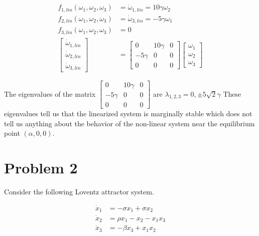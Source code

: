 \documentclass{article}
\begin{document}
  \begin{align*}
    f_{1, lin}(\omega_1,\omega_2, \omega_3) &= \dot{\omega}_{1,lin} = 10\gamma\omega_2 \\
    f_{2, lin}(\omega_1,\omega_2, \omega_3) &= \dot{\omega}_{3,lin} = -5\gamma\omega_1 \\
    f_{3, lin}(\omega_1,\omega_2, \omega_3) &= 0 \\
    \begin{bmatrix}
      \dot{\omega}_{1,lin} \\
      \dot{\omega}_{2,lin} \\
      \dot{\omega}_{3,lin}
    \end{bmatrix} &=
    \begin{bmatrix}
      0 & 10\gamma & 0 \\
      -5\gamma & 0 & 0 \\
      0 & 0 & 0
    \end{bmatrix}
    \begin{bmatrix}
      \omega_1 \\
      \omega_2 \\
      \omega_3
    \end{bmatrix}
  \end{align*}
    
  \noindent The eigenvalues of the matrix 
  $\begin{bmatrix}
      0 & 10\gamma & 0 \\
      -5\gamma & 0 & 0 \\
      0 & 0 & 0
  \end{bmatrix}$
  are $\lambda_{1,2,3} = 0, \pm 5\sqrt{2}\gamma$ \vspace{3.0mm}
  These eigenvalues tell us that the linearized system is marginally stable
  which does not tell us anything about the behavior of the non-linear system
  near the equilibrium point $(\alpha, 0, 0)$. \newpage
    

  \section{Problem 2}

  Consider the following Loventz attractor system.

  \begin{align*}
    \dot{x}_1 &= -\sigma x_1 + \sigma x_2 \\
    \dot{x}_2 &= \rho x_1 - x_2 - x_1x_3 \\
    \dot{x}_3 &= -\beta x_3 + x_1x_2
  \end{align*}
\end{document}
